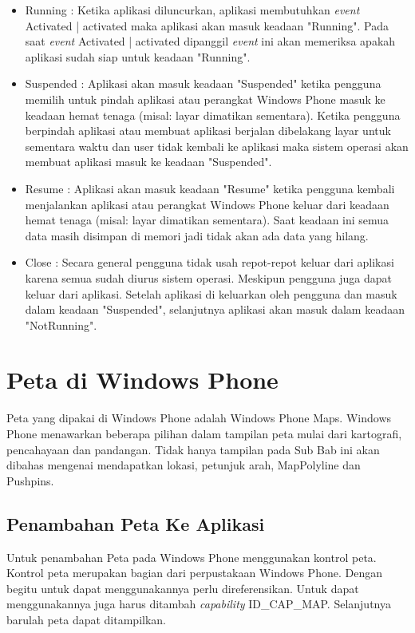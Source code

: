 \begin{itemize}
	\item Running : Ketika aplikasi diluncurkan, aplikasi membutuhkan \textit{event} Activated | activated maka aplikasi akan masuk keadaan "Running". Pada saat \textit{event} Activated | activated dipanggil \textit{event} ini akan memeriksa apakah aplikasi sudah siap untuk keadaan "Running".
	\item Suspended : Aplikasi akan masuk keadaan "Suspended" ketika pengguna memilih untuk pindah aplikasi atau perangkat Windows Phone masuk ke keadaan hemat tenaga (misal: layar dimatikan sementara). Ketika pengguna berpindah aplikasi atau membuat aplikasi berjalan dibelakang layar untuk sementara waktu dan user tidak kembali ke aplikasi maka sistem operasi akan membuat aplikasi masuk ke keadaan "Suspended".
	\item Resume : Aplikasi akan masuk keadaan "Resume" ketika pengguna kembali menjalankan aplikasi atau perangkat Windows Phone keluar dari keadaan hemat tenaga (misal: layar dimatikan sementara). Saat keadaan ini semua data masih disimpan di memori jadi tidak akan ada data yang hilang.
	\item Close : Secara general pengguna tidak usah repot-repot keluar dari aplikasi karena semua sudah diurus sistem operasi. Meskipun pengguna juga dapat keluar dari aplikasi. Setelah aplikasi di keluarkan oleh pengguna dan masuk dalam keadaan "Suspended", selanjutnya aplikasi akan masuk dalam keadaan "NotRunning".
\end{itemize}

\section{Peta di Windows Phone}
\label{sec:Peta di Windows Phone}
\hspace{0.5cm} Peta yang dipakai di Windows Phone adalah Windows Phone Maps. Windows Phone menawarkan beberapa pilihan dalam tampilan peta mulai dari kartografi, pencahayaan dan pandangan. Tidak hanya tampilan pada Sub Bab ini akan dibahas mengenai mendapatkan lokasi, petunjuk arah, MapPolyline dan Pushpins.

\subsection{Penambahan Peta Ke Aplikasi}
\label{subsec:Penambahan Peta Ke Aplikasi}
\hspace{0.5cm} Untuk penambahan Peta pada Windows Phone menggunakan kontrol peta. Kontrol peta merupakan bagian dari perpustakaan Windows Phone. Dengan begitu untuk dapat menggunakannya perlu direferensikan. Untuk dapat menggunakannya juga harus ditambah \textit{capability} ID\_CAP\_MAP. Selanjutnya barulah peta dapat ditampilkan.

